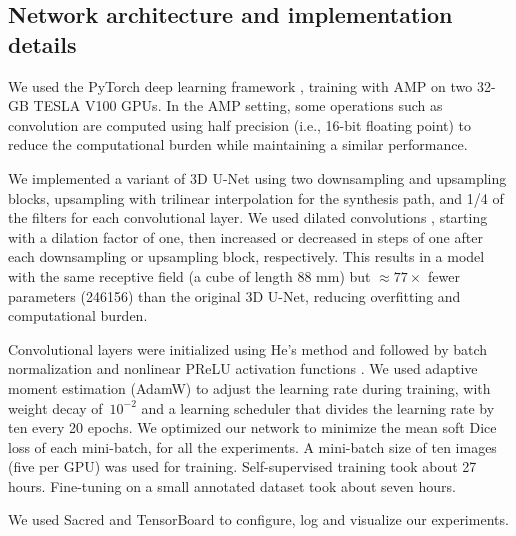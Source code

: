 \subsection{Network architecture and implementation details}

We used the PyTorch deep learning framework \cite{paszke_pytorch_2019}, training with \ac{AMP} on two 32-GB TESLA V100 \acp{GPU}.
In the \ac{AMP} setting, some operations such as convolution are computed using half precision (i.e., 16-bit floating point) to reduce the computational burden while maintaining a similar performance.

We implemented a variant of 3D U-Net \cite{cicek_3d_2016} using two downsampling and upsampling blocks, upsampling with trilinear interpolation for the synthesis path, and 1/4 of the filters for each convolutional layer.
We used dilated convolutions \cite{chen_deeplab_2017}, starting with a dilation factor of one, then increased or decreased in steps of one after each downsampling or upsampling block, respectively.
This results in a model with the same receptive field (a cube of length 88 mm) but $\approx 77 \times$ fewer parameters (\num{246156}) than the original 3D U-Net, reducing overfitting and computational burden.

Convolutional layers were initialized using He's method and followed by batch normalization and nonlinear \ac{PReLU} activation functions \cite{ioffe_batch_2015,he_delving_2015}.
We used adaptive moment estimation (AdamW) \cite{kingma_adam_2014,loshchilov_decoupled_2019} to adjust the learning rate during training, with weight decay of~$10^{-2}$ and a learning scheduler that divides the learning rate by ten every 20 epochs.
We optimized our network to minimize the mean soft Dice loss \cite{milletari_v-net_2016} of each mini-batch, for all the experiments.
A mini-batch size of ten images (five per \ac{GPU}) was used for training.
Self-supervised training took about 27 hours.
Fine-tuning on a small annotated dataset took about seven hours.

We used Sacred \cite{greff_sacred_2017} and TensorBoard \cite{abadi_tensorflow_2016} to configure, log and visualize our experiments.
